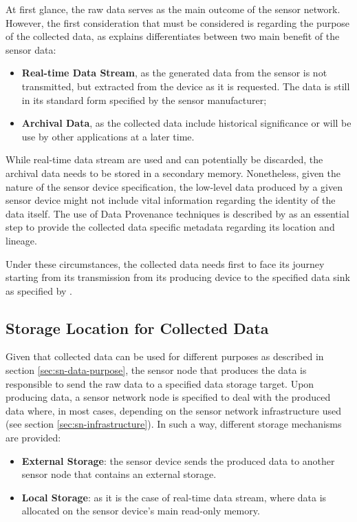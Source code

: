 At first glance, the raw data serves as the main outcome of the sensor network.
However, the first consideration that must be considered is regarding the
purpose of the collected data, as \cite{sn-provenance} explains differentiates
between two main benefit of the sensor data:

\begin{itemize}
  \item \textbf{Real-time Data Stream}, as the generated data from the sensor
  is not transmitted, but extracted from the device as it is requested. The
  data is still in its standard form specified by the sensor manufacturer;
  \item \textbf{Archival Data}, as the collected data include historical
  significance or will be use by other applications at a later time.
\end{itemize}

While real-time data stream are used and can potentially be discarded, the
archival data needs to be stored in a secondary memory. Nonetheless, given the
nature of the sensor device specification, the low-level data produced by a
given sensor device might not include vital information regarding the identity
of the data itself. The use of Data Provenance techniques is described by
\cite{sn-provenance} as an essential step to provide the collected data
specific metadata regarding its location and lineage.

Under these circumstances, the collected data needs first to face its journey
starting from its transmission from its producing device to the specified data
sink as specified by \cite{sn-storage01}\cite{sn-storage02}\cite{sn-storage03}.

\subsection{Storage Location for Collected Data}
\label{sec:sn-storage-locations}

Given that collected data can be used for different purposes as described in
section \ref{sec:sn-data-purpose}, the sensor node that produces the data is responsible to send
the raw data to a specified data storage target. Upon producing data, a sensor
network node is specified to deal with the produced data where, in most cases,
depending on the sensor network infrastructure used \cite{sn-storage03} (see
section \ref{sec:sn-infrastructure}). In such a way, different storage
mechanisms are provided:

\begin{itemize}
  \item \textbf{External Storage}: the sensor device sends the produced data to
  another sensor node that contains an external storage.
  \item \textbf{Local Storage}: as it is the case of real-time data stream,
  where data is allocated on the sensor device's main read-only memory.
\end{itemize}

